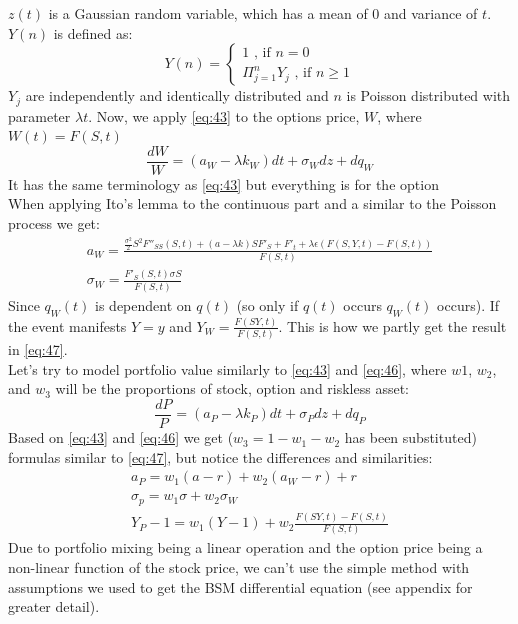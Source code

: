 \documentclass{article}
\begin{document}
$z(t)$ is a Gaussian random variable, which has a mean of 0 and variance of $t$. $Y(n)$ is defined as:
\begin{equation}
    Y(n) = \begin{cases} 1 \text{ , if } n=0 \\
    \Pi_{j=1}^{n} Y_{j} \text{ , if } n\geq1
    \end{cases}
\end{equation}\label{eq:46}
$Y_{j}$ are independently and identically distributed and $n$ is Poisson distributed with parameter $\lambda t$.
Now, we apply \ref{eq:43} to the options price, $W$, where $W(t) = F(S, t)$
\begin{equation}
    \frac{dW}{W} = (a_{W} - \lambda  k_{W}) dt + \sigma_{W} dz + dq_{W}
\end{equation}
It has the same terminology as \ref{eq:43} but everything is for the option \\ [2ex]
When applying Ito’s lemma to the continuous part and a similar to the Poisson process we get:
\begin{equation}\label{eq:47}
\begin{gathered}
    a_{W} = \frac{\frac{\sigma^{2}}{2}S^{2}F''_{SS}(S,t) + (a-\lambda k) S F'_{S} + F'_{t} + \lambda \epsilon (F(S,Y,t) - F(S,t))}{F(S,t)}\\
    \sigma _{W} = \frac{F'_{S}(S,t) \sigma S}{F(S,t)}
\end{gathered}
\end{equation}
Since $q_{W}(t)$ is dependent on $q(t)$ (so only if $q(t)$ occurs $q_{W}(t)$ occurs). If the event manifests $Y = y$ and $Y_{W} = \frac{F(SY, t)}{F(S, t)}$. This is how we partly get the result in \ref{eq:47}. \\[2ex]
Let’s try to model portfolio value similarly to \ref{eq:43} and \ref{eq:46}, where $w{1}$, $w_{2}$, and $w_{3}$ will be the proportions of stock, option and riskless asset:
\begin{equation}
    \frac{dP}{P} = (a_{P} - \lambda  k_{P}) dt + \sigma_{P} dz + dq_{P}
\end{equation}
Based on \ref{eq:43} and \ref{eq:46} we get ($w_{3} = 1 - w_{1} - w_{2}$ has been substituted) formulas similar to \ref{eq:47}, but notice the differences and similarities:
\begin{equation} \label{eq:49}
    \begin{gathered}
    a_{P} = w_{1}(a - r) + w_{2}(a_{W} -r) + r \\
    \sigma_{p} = w_{1}\sigma + w_{2}\sigma_{W} \\
    Y_{P} - 1 = w_{1}(Y - 1) +  w_{2}\frac{F(SY, t) - F(S, t)}{ F(S, t) }
    \end{gathered}
\end{equation}
Due to portfolio mixing being a linear operation and the option price being a non-linear function of the stock price, we can’t use the simple method with assumptions we used to get the BSM differential equation (see appendix for greater detail).
\end{document}
